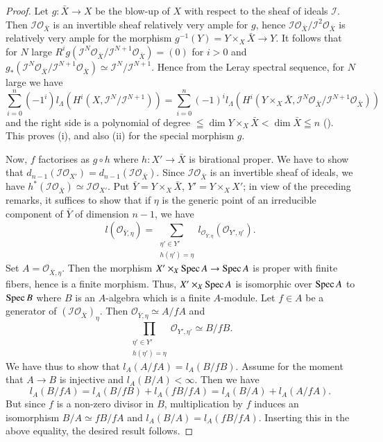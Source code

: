 \begin{proof}
Let $g: \bar{X} \to X$ be the blow-up of $X$ with respect to the sheaf of ideals $\mathscr{I}$. Then $\mathscr{I}\mathscr{O}_{\bar{X}}$ is an invertible sheaf relatively very ample for $g$, hence $\mathscr{I} \mathscr{O}_{\bar{X}} / \mathscr{I}^2 \mathscr{O}_{\bar{X}}$ is relatively very ample for the morphism $g^{-1} (Y) = Y \times_X \bar{X} \to Y$. It follows that for $N$ large $R^i g (\mathscr{I}^N \mathscr{O}_{\bar{X}} / \mathscr{I}^{N+1} \mathscr{O}_{\bar{X}}) = (0)$ for $i> 0$ and $g_* (\mathscr{I}^N \mathscr{O}_{\bar{X}}/ \mathscr{I}^{N+1} \mathscr{O}_{\bar{X}}) \simeq \mathscr{I}^N / \mathscr{I}^{N+1}$. Hence from the Leray spectral sequence, for $N$ large we have 
{\fontsize{10pt}{12pt}\selectfont
$$
\sum\limits^n_{i=0} (-1^i) l_\Lambda (H^i (X, \mathscr{I}^N/\mathscr{I}^{N+1})) = \sum\limits^n_{i=0} (-1)^i l_\Lambda (H^i (Y \times_X \bar{X}, \mathscr{I}^N \mathscr{O}_{\bar{X}} / \mathscr{I}^{N+1} \mathscr{O}_{\bar{X}}))
$$}\relax
and the right side is a polynomial of degree $\leqq \dim Y \times_X \bar{X} < \dim \bar{X} \leqq n$ (\cite{art11-key1}). This proves (i), and also (ii) for the special morphism $g$. 

Now, $f$ factorises as $g \circ h$ where $h : X' \to \bar{X}$ is birational proper. We have to show that $d_{n-1} (\mathscr{I}\mathscr{O}_{X'}) = d_{n-1} (\mathscr{I} \mathscr{O}_{\bar{X}})$. Since $\mathscr{I} \mathscr{O}_{\bar{X}}$ is an invertible sheaf of ideals, we have $h^* (\mathscr{I} \mathscr{O}_{\bar{X}}) \simeq \mathscr{I} \mathscr{O}_{X'}$. Put $\bar{Y} = Y \times_X \bar{X}$, $Y' = Y \times_X X'$; in view of the preceding remarks, it suffices to show that if $\eta$ is the generic point of an irreducible component of $\bar{Y}$ of dimension $n-1$, we have 
$$
l(\mathscr{O}_{\bar{Y}, \eta}) = \sum\limits_{\substack{\eta' \in Y'\\ h (\eta') = \eta}} l_{\mathscr{O}_{\bar{Y}, \eta}} (\mathscr{O}_{{Y'}, \eta'}).
$$
Set $A = \mathscr{O}_{\bar{X},\eta}$. Then the morphism $X' \times_X \operatorname{Spec} A \to \operatorname{Spec} A$ is proper with finite fibers, hence is a finite morphism. Thus, $X' \times_X \operatorname{Spec} A$ is isomorphic over $\operatorname{Spec} A$ to $\operatorname{Spec} B$ where $B$ is an $A$-algebra which is a finite $A$-module. Let $f \in A$ be a generator of $(\mathscr{I} \mathscr{O}_{\bar{X}})_\eta$. Then $\mathscr{O}_{\bar{Y},\eta} \simeq A / fA$ and
$$
\prod\limits_{\substack{\eta' \in Y' \\ h (\eta') = \eta}} \mathscr{O}_{Y', \eta'} \simeq B / f B.
$$
We have thus to show that $l_A (A/ fA) = l_A (B/fB)$. Assume for the moment that $A \to B$ is injective and $l_A (B/A)< \infty$. Then we have 
$$
l_A (B / fA) = l_A (B / fB) + l_A (f B / fA) = l_A (B/A) + l_A (A / fA). 
$$
But since $f$ is a non-zero divisor in $B$, multiplication by $f$ induces an isomorphism $B/A \simeq f B /fA$ and $l_A (B/A)= l_A (fB/fA)$. Inserting this in the above equality, the desired result follows.


\end{proof}
